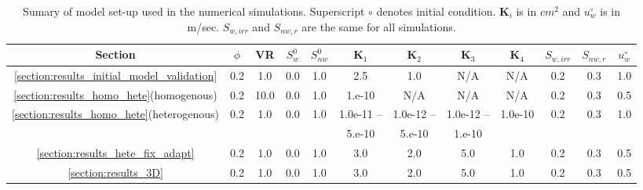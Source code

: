 \begin{landscape}
\begin{table}
  \begin{tabular}{c | c c  c  c  c  c  c  c  c  c   c}
    \hline
      {\bf Section} & $\phi$ & VR  & $S^{0}_{w}$ & $S^{0}_{nw}$ & $\mathbf{K}_{1}$ & $\mathbf{K}_{2}$ & $\mathbf{K}_{3}$ & $\mathbf{K}_{4}$ & $S_{w,irr}$ & $S_{nw,r}$ & $u^{\circ}_{w}$ \\ 
    \hline
     \ref{section:results_initial_model_validation} & 0.2 & 1.0 & 0.0 & 1.0 & 2.5 & 1.0 & N/A & N/A & 0.2 & 0.3 & 1.0 \\
     \ref{section:results_homo_hete}(homogenous)  & 0.2 & 10.0 & 0.0 & 1.0 & 1.e-10 & N/A & N/A & N/A & 0.2 & 0.3 & 0.5  \\
     \ref{section:results_homo_hete}(heterogenous) & 0.2 & 1.0 & 0.0 & 1.0 & 1.0e-11 -- & 1.0e-12 -- & 1.0e-12 -- & 1.0e-10 & 0.2  & 0.3 & 1.0 \\
      &   &  &  &  & 5.e-10 & 5.e-10 & 1.e-10  &  &  &  & \\
     \ref{section:results_hete_fix_adapt}  & 0.2 & 1.0 & 0.0 & 1.0  & 3.0 & 2.0 & 5.0 & 1.0 & 0.2 & 0.3 & 0.5  \\
     \ref{section:results_3D}  & 0.2 & 1.0 & 0.0 & 1.0 & 3.0 & 2.0 & 5.0 & 1.0 & 0.2  & 0.3 & 0.5  \\
     \hline
   \end{tabular}
   \caption{Sumary of model set-up used in the numerical simulations. Superscript $\circ$ denotes initial condition. $\mathbf{K}_{i}$ is in $cm^{2}$ and $u^{\circ}_{w}$ is in m/sec. $S_{w,irr}$ and $S_{nw,r}$ are the same for all simulations.  }
\label{table:setup}
\end{table}
\end{landscape}
\clearpage


